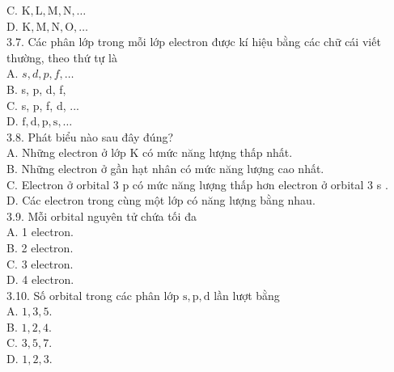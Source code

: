 \documentclass[10pt]{article}
\begin{document}
C. $\mathrm{K}, \mathrm{L}, \mathrm{M}, \mathrm{N}, \ldots$\\
D. $\mathrm{K}, \mathrm{M}, \mathrm{N}, \mathrm{O}, \ldots$\\
3.7. Các phân lớp trong mỗi lớp electron được kí hiệu bằng các chữ cái viết thường, theo thứ tự là\\
A. $s, d, p, f, \ldots$\\
B. s, p, d, f,\\
C. s, p, f, d, ...\\
D. $\mathrm{f}, \mathrm{d}, \mathrm{p}, \mathrm{s}, \ldots$\\
3.8. Phát biểu nào sau đây đúng?\\
A. Những electron ở lớp K có mức năng lượng thấp nhất.\\
B. Những electron ở gần hạt nhân có mức năng lượng cao nhất.\\
C. Electron ở orbital 3 p có mức năng lượng thấp hơn electron ở orbital 3 s .\\
D. Các electron trong cùng một lớp có năng lượng bằng nhau.\\
3.9. Mỗi orbital nguyên tử chứa tối đa\\
A. 1 electron.\\
B. 2 electron.\\
C. 3 electron.\\
D. 4 electron.\\
3.10. Số orbital trong các phân lớp $\mathrm{s}, \mathrm{p}, \mathrm{d}$ lần lượt bằng\\
A. $1,3,5$.\\
B. $1,2,4$.\\
C. $3,5,7$.\\
D. $1,2,3$.
\end{document}
